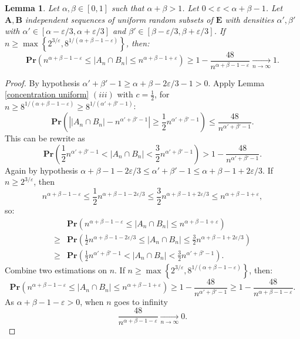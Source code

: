 \documentclass{article}
\newcommand{\bs}{\boldsymbol}
\newcommand{\tendvers}{\xrightarrow[n\to\infty]{}}
\def\Pr{\mathbf{Pr}}
\newtheorem{lem}[thm]{Lemma}
\theoremstyle{remark}
\begin{document}
\begin{lem}\label{aux intersection} Let $\alpha,\beta\in [0,1]$ such that $\alpha + \beta > 1$. Let $0<\varepsilon<\alpha+\beta-1$. Let $\bs A, \bs B$ independent sequences of uniform random subsets of $\bs E$ with densities $\alpha',\beta'$ with $\alpha'\in [\alpha-\varepsilon/3,  \alpha+\varepsilon/3]$ and $\beta'\in [\beta-\varepsilon/3, \beta+\varepsilon/3]$. If $n\geq \max\left\{2^{3/\varepsilon},8^{1/(\alpha+\beta-1-\varepsilon)}\right\}$, then:
\[\Pr\left(n^{\alpha+\beta-1-\varepsilon}\leq |A_n\cap B_n|\leq n^{\alpha+\beta-1+\varepsilon}\right)\geq 1-\frac{48}{n^{\alpha+\beta-1-\varepsilon}}\tendvers 1.\]
\end{lem}
\begin{proof}
    By hypothesis $\alpha'+\beta'-1\geq\alpha+\beta-2\varepsilon/3-1>0$. Apply Lemma \ref{concentration uniform} $(iii)$ with $c = \frac{1}{2}$, for $n\geq 8^{1/(\alpha+\beta-1-\varepsilon)}\geq 8^{1/(\alpha'+\beta'-1)}$:
    \[\Pr\left(\left||A_n\cap B_n|-n^{\alpha'+\beta'-1}\right|\geq \frac{1}{2}n^{\alpha'+\beta'-1}\right)\leq  \frac{48}{n^{\alpha'+\beta'-1}}.\]
    This can be rewrite as 
    \[\Pr\left(\frac{1}{2}n^{\alpha' + \beta' -1} < |A_n\cap B_n| < \frac{3}{2}n^{\alpha' + \beta' -1} \right) > 1-\frac{48}{n^{\alpha'+\beta'-1}}.\]
    Again by hypothesis $\alpha + \beta -1 - 2\varepsilon/3\leq \alpha'+\beta'-1\leq \alpha + \beta -1 + 2\varepsilon/3$. If $n\geq 2^{3/\varepsilon}$, then
    \[n^{\alpha+\beta-1-\varepsilon}\leq \frac{1}{2}n^{\alpha + \beta -1 - 2\varepsilon/3} \leq \frac{3}{2}n^{\alpha + \beta -1 + 2\varepsilon/3} \leq n^{\alpha+\beta-1+\varepsilon},\]
    so:
    \[\begin{split}&\Pr\left(n^{\alpha+\beta-1-\varepsilon}\leq |A_n\cap B_n|\leq n^{\alpha+\beta-1+\varepsilon} \right)\\
    \geq & \Pr\left(\frac{1}{2}n^{\alpha + \beta -1 - 2\varepsilon/3}\leq |A_n\cap B_n|\leq \frac{3}{2}n^{\alpha + \beta -1 + 2\varepsilon/3} \right)\\
    \geq & \Pr\left(\frac{1}{2}n^{\alpha' + \beta' -1} < |A_n\cap B_n| < \frac{3}{2}n^{\alpha' + \beta' -1} \right).
    \end{split}\]
    Combine two estimations on $n$. If $n\geq \max\left\{2^{3/\varepsilon},8^{1/(\alpha+\beta-1-\varepsilon)}\right\}$, then:
    \[\Pr\left(n^{\alpha+\beta-1-\varepsilon}\leq |A_n\cap B_n|\leq n^{\alpha+\beta-1+\varepsilon}\right)\geq 1-\frac{48}{n^{\alpha'+\beta'-1}}\geq  1-\frac{48}{n^{\alpha+\beta-1-\varepsilon}}.\]
    As $\alpha+\beta-1-\varepsilon>0$, when $n$ goes to infinity
    \[\frac{48}{n^{\alpha+\beta-1-\varepsilon}}\tendvers 0.\]
\end{proof}
\end{document}
